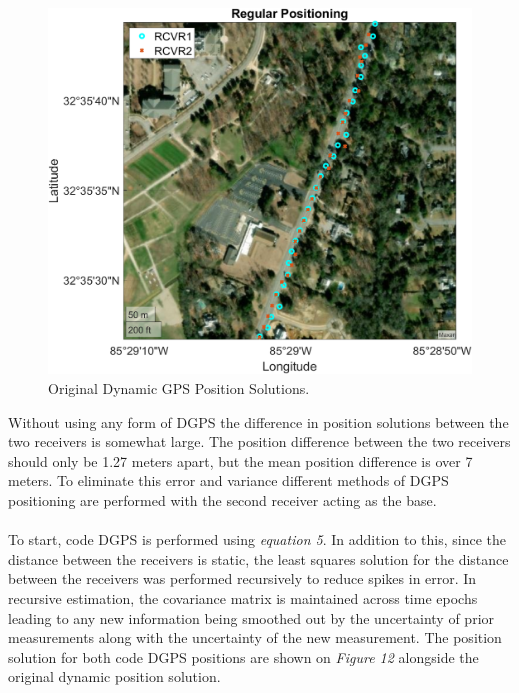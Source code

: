 \documentclass[11pt]{article}
\begin{document}
\begin{enumerate}[label=\textbf{\arabic*.}]
\begin{figure}[H]
\begin{minipage}[b]{0.49\textwidth}
          \includegraphics[width=\textwidth]{p3_a1.png}
        \end{minipage}
        \caption{Original Dynamic GPS Position Solutions.}
      \end{figure}
      Without using any form of DGPS the difference in position solutions between the two 
      receivers is somewhat large. The position difference between the two receivers should 
      only be 1.27 meters apart, but the mean position difference is over 7 meters. To 
      eliminate this error and variance different methods of DGPS positioning are performed 
      with the second receiver acting as the base. 
      \\ \\
      To start, code DGPS is performed using \emph{equation 5}. In addition to this, since 
      the distance between the receivers is static, the least squares solution for the 
      distance between the receivers was performed recursively to reduce spikes in error. 
      In recursive estimation, the covariance matrix is maintained across time epochs 
      leading to any new information being smoothed out by the uncertainty of prior 
      measurements along with the uncertainty of the new measurement. The position solution 
      for both code DGPS positions are shown on \emph{Figure 12} alongside the original 
      dynamic position solution.
      \begin{figure}[H]
        \centering
        \begin{minipage}[b]{0.49\textwidth}

\end{minipage}
\end{figure}
\end{enumerate}
\end{document}
